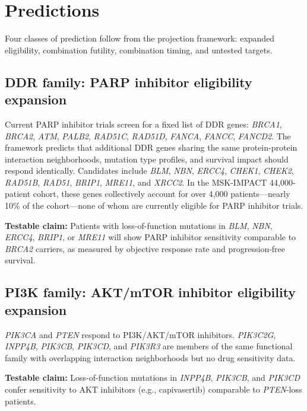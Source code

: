 \documentclass[11pt]{article}
\begin{document}
\section{Predictions}
\label{sec:predictions}

Four classes of prediction follow from the projection framework:
expanded eligibility, combination futility, combination timing, and
untested targets.

\subsection{DDR family: PARP inhibitor eligibility expansion}

Current PARP inhibitor trials screen for a fixed list of DDR genes:
\emph{BRCA1}, \emph{BRCA2}, \emph{ATM}, \emph{PALB2},
\emph{RAD51C}, \emph{RAD51D}, \emph{FANCA}, \emph{FANCC},
\emph{FANCD2}. The framework predicts that additional DDR genes
sharing the same protein-protein interaction neighborhoods, mutation
type profiles, and survival impact should respond identically.
Candidates include \emph{BLM}, \emph{NBN}, \emph{ERCC4},
\emph{CHEK1}, \emph{CHEK2}, \emph{RAD51B}, \emph{RAD51},
\emph{BRIP1}, \emph{MRE11}, and \emph{XRCC2}. In the MSK-IMPACT
44{,}000-patient cohort, these genes collectively account for over
4{,}000 patients---nearly 10\% of the cohort---none of whom are
currently eligible for PARP inhibitor trials.

\textbf{Testable claim:} Patients with loss-of-function mutations in
\emph{BLM}, \emph{NBN}, \emph{ERCC4}, \emph{BRIP1}, or \emph{MRE11}
will show PARP inhibitor sensitivity comparable to \emph{BRCA2}
carriers, as measured by objective response rate and
progression-free survival.

\subsection{PI3K family: AKT/mTOR inhibitor eligibility expansion}

\emph{PIK3CA} and \emph{PTEN} respond to PI3K/AKT/mTOR inhibitors.
\emph{PIK3C2G}, \emph{INPP4B}, \emph{PIK3CB}, \emph{PIK3CD}, and
\emph{PIK3R3} are members of the same functional family with
overlapping interaction neighborhoods but no drug sensitivity data.

\textbf{Testable claim:} Loss-of-function mutations in
\emph{INPP4B}, \emph{PIK3CB}, and \emph{PIK3CD} confer sensitivity
to AKT inhibitors (e.g., capivasertib) comparable to
\emph{PTEN}-loss patients.
\end{document}
